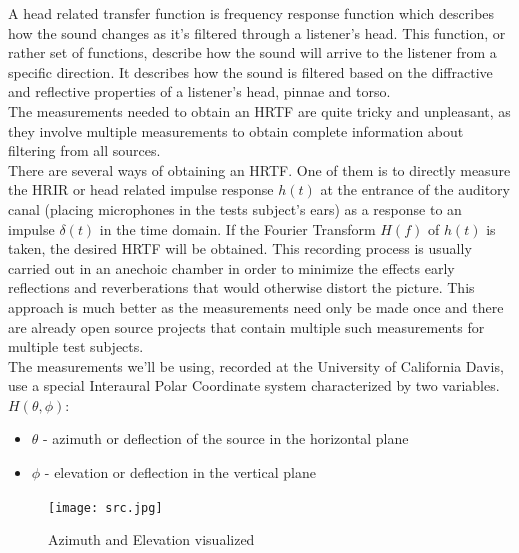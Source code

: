 \documentclass[a4paper,12pt,oneside]{article}
\begin{document}
A head related transfer function is frequency response function which describes how the sound changes as it's filtered through a listener's head. This function, or rather set of functions, describe how the sound will arrive to the listener from a specific direction. It describes how the sound is filtered based on the diffractive and reflective properties of a listener's head, pinnae and torso.\\
The measurements needed to obtain an HRTF are quite tricky and unpleasant, as they involve multiple measurements to obtain complete information about filtering from all sources.\\
There are several ways of obtaining an HRTF. One of them is to directly measure the HRIR or head related impulse response $h(t)$ at the entrance of the auditory canal (placing microphones in the tests subject's ears) as a response to an impulse $\delta(t)$ in the time domain. If the Fourier Transform $H(f)$ of $h(t)$ is taken, the desired HRTF will be obtained. This recording process is usually carried out in an anechoic chamber in order to minimize the effects early reflections and reverberations that would otherwise distort the picture. This approach is much better as the measurements need only be made once and there are already open source projects that contain multiple such measurements for multiple test subjects.\cite{cipic1}\\


The measurements we'll be using, recorded at the University of California Davis, use a special Interaural Polar Coordinate system characterized by two variables. \cite{cipic2} $H(\theta,\phi)$:
\begin{itemize}
\item $\theta$ - azimuth or deflection of the source in the horizontal plane
\item $\phi$ - elevation or deflection in the vertical plane
\end{itemize}

\begin{center}
\begin{figure}[H]
    \centering
\texttt{[image: src.jpg]}
    \caption{Azimuth and Elevation visualized}
    \label{fig:source positions}
\end{figure}
\end{center}
\end{document}
